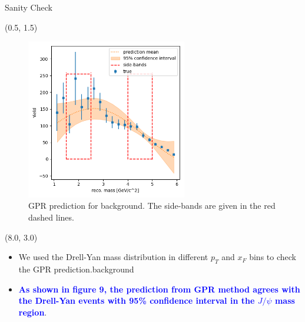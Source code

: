 \documentclass[10pt, xcolor={dvipsnames}, aspectratio = 169]{beamer}
\newcommand{\jpsi}{$J/\psi$ }
\begin{document}
%
%
%

\begin{frame}{Sanity Check}

\begin{textblock}{7.0}(0.5, 1.5)
\begin{figure}
    \centering
    \includegraphics[width=7.0cm]{imgs/mass_pt.png}
    \caption{GPR prediction for background. The side-bands are given in the red dashed lines.}
\end{figure}
\end{textblock}

\begin{textblock}{7.0}(8.0, 3.0)
\begin{itemize}

  \item We used the Drell-Yan mass distribution in different $p_{T}$ and $x_{F}$ bins to check the GPR prediction.background

  \item \textcolor{blue}{\textbf{As shown in figure 9, the prediction from GPR method agrees with the Drell-Yan events with 95\% confidence interval in the \jpsi mass region}}.

\end{itemize}
\end{textblock}

\end{frame}
\end{document}
